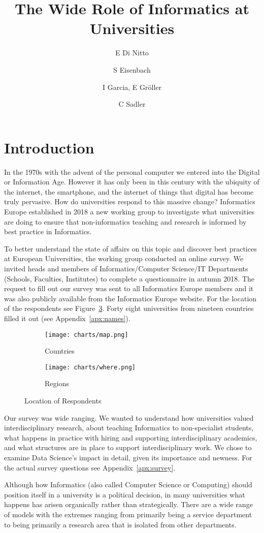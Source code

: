 \documentclass[11pt]{amsart}
\title{The Wide Role of Informatics at Universities}
\author{E Di Nitto \and S Eisenbach \and I Garcia, E Gr\"{o}ller \and C Sadler}
\begin{document}
\maketitle
\section{Introduction}

In the 1970s with the advent of the personal computer we entered into the Digital or Information Age. However it has only been in this century with the ubiquity of the internet, the smartphone, and the internet of things that digital has become truly pervasive. How do universities respond to this massive change? Informatics Europe established in 2018 a new working group to investigate what universities are doing to ensure that non-informatics teaching and research is informed by best practice in Informatics.

To better understand the state of affairs on this topic and discover best practices at European Universities, the working group conducted an online survey. We invited heads and members of Informatics/Computer Science/IT Departments (Schools, Faculties, Institutes) to complete a questionnaire in autumn 2018. The request to fill out our survey was sent to all Informatics Europe members and it was also publicly available from the Informatics Europe website.  For the location of the respondents see Figure~\ref{fig:mapandmembers}.  Forty eight universities from nineteen countries filled it out (see Appendix~\ref{apx:names}).

\begin{figure}[h]
\centering
\begin{subfigure}{.5\textwidth}
  \centering
  \texttt{[image: charts/map.png]}
  \caption{Countries}
  \label{fig:map}
\end{subfigure}%
\begin{subfigure}{.5\textwidth}
  \centering
  \texttt{[image: charts/where.png]}
   \caption{Regions}
  \label{fig:members}
\end{subfigure}
\caption{Location of Respondents}
\label{fig:mapandmembers}
\end{figure}

Our survey was wide ranging. We wanted to understand how universities valued interdisciplinary research, about teaching Informatics to non-specialist students, what happens in practice with hiring and supporting interdisciplinary academics, and what structures are in place to support interdisciplinary work. We chose to examine Data Science's impact in detail, given its importance and newness. For the actual survey questions see Appendix~\ref{apx:survey}. 

Although how Informatics (also called Computer Science or Computing) should position itself in a university is a political decision, in many universities what happens has arisen organically rather than strategically. There are a wide range of models with the extremes ranging from primarily being a service department to being primarily a research area that is isolated from other departments.








\end{document}
